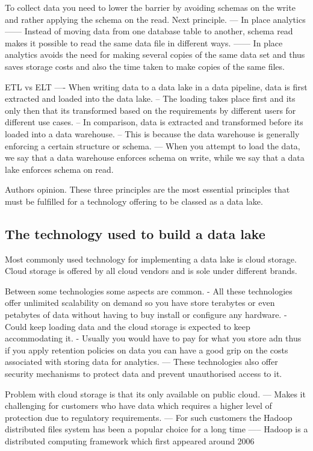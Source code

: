 \documentclass[a4paper, 11pt]{article}
\begin{document}
    To collect data you need to lower the barrier by avoiding schemas on the write and rather applying the schema on the read.
    Next principle.
    --- In place analytics
    ------ Instead of moving data from one database table to another, schema read makes it possible to read the same data file in different ways.
    ------ In place analytics avoids the need for making several copies of the same data set and thus saves storage costs and also the time taken to make copies of the same files.

    ETL vs ELT
    ---- When writing data to a data lake in a data pipeline, data is first extracted and loaded into the data lake.
    -- The loading takes place first and its only then that its transformed based on the requirements by different users for different use cases.
    -- In comparison, data is extracted and transformed before its loaded into a data warehouse.
    -- This is because the data warehouse is generally enforcing a certain structure or schema.
    --- When you attempt to load the data, we say that a data warehouse enforces schema on write, while we say that a data lake enforces schema on read.

    Authors opinion.
    These three principles are the most essential principles that must be fulfilled for a technology offering to be classed as a data lake.

    \subsection{The technology used to build a data lake}
    Most commonly used technology for implementing a data lake is cloud storage.
    Cloud storage is offered by all cloud vendors and is sole under different brands.

    Between some technologies some aspects are common.
    - All these technologies offer unlimited scalability on demand so you have store terabytes or even petabytes of data without having to buy install or configure any hardware.
    - Could keep loading data and the cloud storage is expected to keep accommodating it.
    - Usually you would have to pay for what you store adn thus if you apply retention policies on data you can have a good grip on the costs associated with storing data for analytics.
    --- These technologies also offer security mechanisms to protect data and prevent unauthorised access to it.

    Problem with cloud storage is that its only available on public cloud.
    --- Makes it challenging for customers who have data which requires a higher level of protection due to regulatory requirements.
    --- For such customers the Hadoop distributed files system has been a popular choice for a long time
    ----- Hadoop is a distributed computing framework which first appeared around 2006
\end{document}

